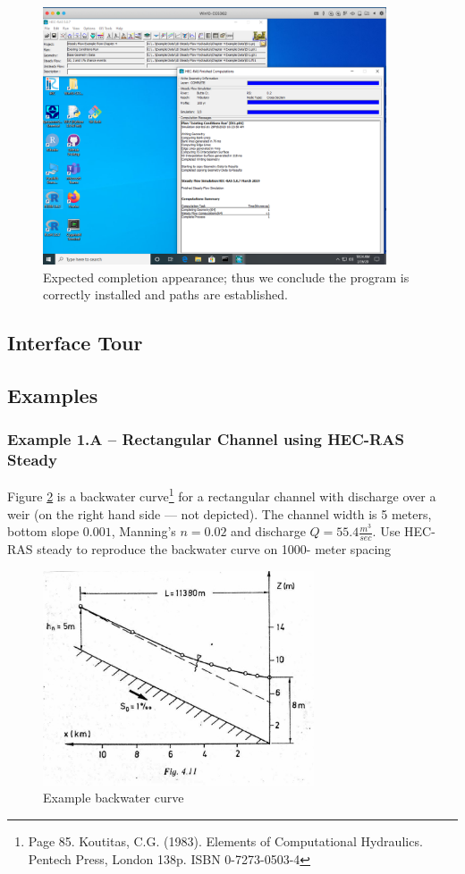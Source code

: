 \begin{figure}[h!] %
   \centering
   \includegraphics[width=4in]{hecras-done.png} 
   \caption{Expected completion appearance; thus we conclude the program is correctly installed and paths are established.}
   \label{fig:hecras-done}
\end{figure}

\subsection{Interface Tour}

\clearpage
\subsection{Examples}
\subsubsection{Example 1.A -- Rectangular Channel using HEC-RAS Steady}
Figure \ref{fig:example1} is a backwater curve\footnote{Page 85. Koutitas, C.G. (1983). Elements of Computational Hydraulics. Pentech Press, London 138p. ISBN 0-7273-0503-4 } for a rectangular channel with discharge over a weir (on the right hand side --- not depicted).  The channel width is 5 meters, bottom slope $0.001$, Manning's $n=0.02$ and discharge $Q=55.4 \frac{m^3}{sec}$.  
Use HEC-RAS steady to reproduce the backwater curve on 1000- meter spacing

\begin{figure}[h!] %
   \centering
   \includegraphics[height=2.5in]{bw_curve1.jpg} 
   \caption{Example backwater curve} 
   \label{fig:example1}
\end{figure}



